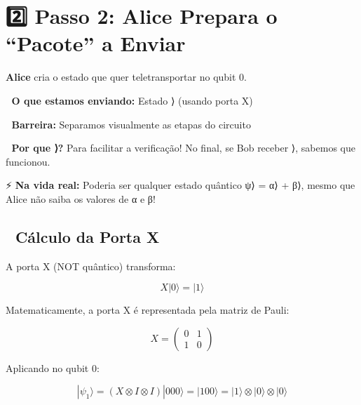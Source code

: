 \documentclass[
  brazilian,
]{report}
\begin{document}
\section{2️⃣ Passo 2: Alice Prepara o ``Pacote'' a
Enviar}\label{passo-2-alice-prepara-o-pacote-a-enviar}

\textbf{Alice} cria o estado que quer teletransportar no qubit 0.

🎁 \textbf{O que estamos enviando:} Estado ⟩ (usando porta X)

🚧 \textbf{Barreira:} Separamos visualmente as etapas do circuito

💭 \textbf{Por que ⟩?} Para facilitar a verificação! No final,
se Bob receber ⟩, sabemos que funcionou.

⚡ \textbf{Na vida real:} Poderia ser qualquer estado quântico
\textbar ψ⟩ = α⟩ + β⟩, mesmo que Alice não saiba os
valores de α e β!

\subsection{📐 Cálculo da Porta X}\label{cuxe1lculo-da-porta-x}

A porta X (NOT quântico) transforma:

\[X|0\rangle = |1\rangle\]

Matematicamente, a porta X é representada pela matriz de Pauli:

\[X = \begin{pmatrix} 0 & 1 \\ 1 & 0 \end{pmatrix}\]

Aplicando no qubit 0:

\[|\psi_1\rangle = (X \otimes I \otimes I)|000\rangle = |100\rangle = |1\rangle \otimes |0\rangle \otimes |0\rangle\]
\end{document}
